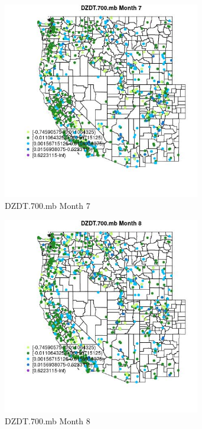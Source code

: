 \begin{figure} 
\centering  
\includegraphics[width=0.77\textwidth]{Code_Outputs/Report_ML_input_PM25_Step4_part_e_de_duplicated_aves_compiled_2019-05-21wNAs_MapObsMo7DZDT700mb.jpg} 
\caption{\label{fig:Report_ML_input_PM25_Step4_part_e_de_duplicated_aves_compiled_2019-05-21wNAsMapObsMo7DZDT700mb}DZDT.700.mb Month 7} 
\end{figure} 
 

\clearpage 

\begin{figure} 
\centering  
\includegraphics[width=0.77\textwidth]{Code_Outputs/Report_ML_input_PM25_Step4_part_e_de_duplicated_aves_compiled_2019-05-21wNAs_MapObsMo8DZDT700mb.jpg} 
\caption{\label{fig:Report_ML_input_PM25_Step4_part_e_de_duplicated_aves_compiled_2019-05-21wNAsMapObsMo8DZDT700mb}DZDT.700.mb Month 8} 
\end{figure} 
 

